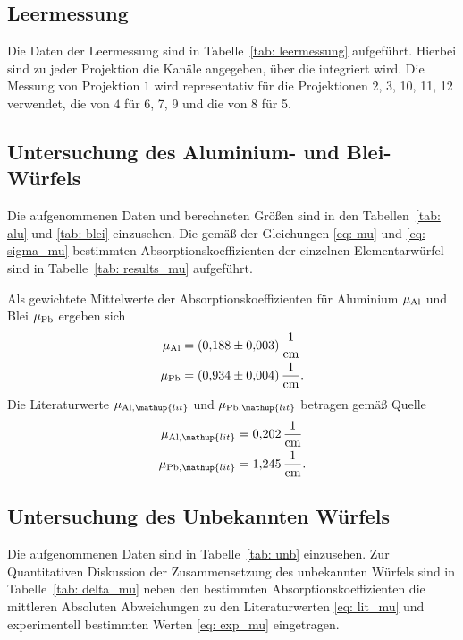 \subsection{Leermessung}
Die Daten der Leermessung sind in Tabelle~\ref{tab: leermessung} aufgeführt. Hierbei sind zu jeder Projektion
die Kanäle angegeben, über die integriert wird. Die Messung von Projektion $1$ wird representativ für die
Projektionen 2, 3, 10, 11, 12 verwendet, die von $4$ für 6, 7, 9 und die von $8$ für 5.


\subsection{Untersuchung des Aluminium- und Blei-Würfels}
Die aufgenommenen Daten und berechneten Größen sind in den Tabellen~\ref{tab: alu} und \ref{tab: blei} einzusehen.
Die gemäß der Gleichungen \eqref{eq: mu} und \eqref{eq: sigma_mu} bestimmten Absorptionskoeffizienten
der einzelnen Elementarwürfel sind in Tabelle~\ref{tab: results_mu} aufgeführt.
\FloatBarrier



Als gewichtete Mittelwerte der Absorptionskoeffizienten für Aluminium $\mu_{\ce{Al}}$ und Blei $\mu_{\ce{Pb}}$
ergeben sich
\begin{align}
  \begin{aligned}
  \mu_{\ce{Al}} &= \SI{0.188(3)}{\per\centi\meter}\\
  \mu_{\ce{Pb}} &= \SI{0.934(4)}{\per\centi\meter}.
  \label{eq: exp_mu}
\end{aligned}
\end{align}
Die Literaturwerte $\mu_{\ce{Al}, \mathup{lit}}$ und $\mu_{\ce{Pb}, \mathup{lit}}$ betragen gemäß Quelle \cite{mu}
\begin{align}
  \begin{aligned}
  \mu_{\ce{Al}, \mathup{lit}} &= \SI{0.202}{\per\centi\meter} \\
  \mu_{\ce{Pb}, \mathup{lit}} &= \SI{1.245}{\per\centi\meter}.
  \label{eq: lit_mu}
\end{aligned}
\end{align}

\FloatBarrier

\subsection{Untersuchung des Unbekannten Würfels}
Die aufgenommenen Daten sind in Tabelle~\ref{tab: unb} einzusehen. Zur Quantitativen Diskussion der Zusammensetzung
des unbekannten Würfels sind in Tabelle~\ref{tab: delta_mu} neben den bestimmten Absorptionskoeffizienten die mittleren Absoluten
Abweichungen zu den Literaturwerten \eqref{eq: lit_mu} und experimentell bestimmten Werten \eqref{eq: exp_mu} eingetragen.
\FloatBarrier


\FloatBarrier
